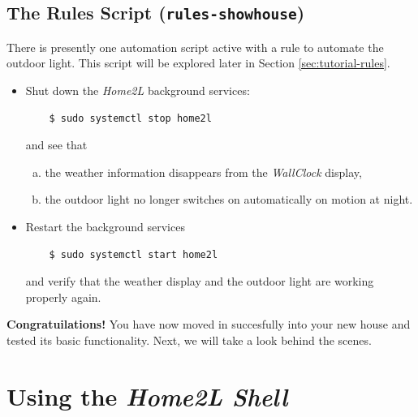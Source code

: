 \documentclass[12pt,english,parskip=half]{scrreprt}
\begin{document}
\subsection{The Rules Script (\texttt{rules-showhouse})}
\label{sec:tutorial-firststeps-rules}


There is presently one automation script active with a rule to
automate the outdoor light.
This script will be explored later in Section \ref{sec:tutorial-rules}.

\begin{itemize}[$\blacktriangleright$]

\item
  Shut down the \emph{Home2L} background services:
  \begin{lstlisting}
    $ sudo systemctl stop home2l
  \end{lstlisting}
  and see that

  \begin{enumerate}[a)]
  \item
    the weather information disappears from the \emph{WallClock} display,
  \item
    the outdoor light no longer switches on automatically on motion at night.
  \end{enumerate}

\item
  Restart the background services
  \begin{lstlisting}
    $ sudo systemctl start home2l
  \end{lstlisting}
  and verify that the weather display and the outdoor light are working properly again.

\end{itemize}


\textbf{Congratuilations!} You have now moved in succesfully into your new house and
tested its basic functionality. Next, we will take a look behind the scenes.





\section{Using the \emph{Home2L Shell}}
\label{sec:tutorial-shell}
\end{document}

